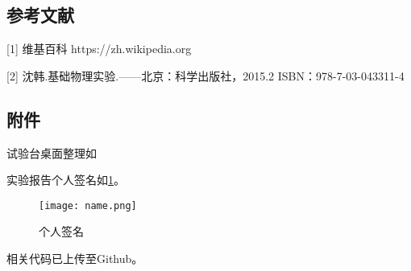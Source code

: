 \documentclass[dvipsnames, svgnames,a4paper,11pt]{article}
\begin{document}
	\subsection{参考文献}
	[1] 维基百科 https://zh.wikipedia.org
	
	[2] 沈韩.基础物理实验.——北京：科学出版社，2015.2 ISBN：978-7-03-043311-4
	
	
	\subsection{附件}
	试验台桌面整理如%
	
	实验报告个人签名如\cref{fig:name}。
	
	\begin{figure}[htbp]
		\centering
		\texttt{[image: name.png]}
		\caption{个人签名}
		\label{fig:name}
	\end{figure}
	
	
	相关代码已上传至Github。
	
	
	
\end{document}
